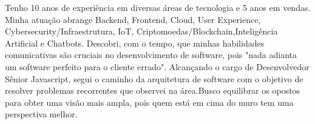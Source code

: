 

\begin{cvparagraph}

\vspace{2mm}

Tenho 10 anos de experiência em diversas áreas de tecnologia e 5 anos em vendas. Minha atuação abrange Backend, Frontend, Cloud, User Experience, Cybersecurity/Infraestrutura, IoT, Criptomoedas/Blockchain,Inteligência Artificial e Chatbots.
Descobri, com o tempo, que minhas habilidades comunicativas são cruciais no desenvolvimento de software, pois "nada adianta um software perfeito para o cliente errado". Alcançando o cargo de Desenvolvedor Sênior Javascript, segui o caminho da arquitetura de software com o objetivo de resolver problemas recorrentes que observei na área.Busco equilibrar os opostos para obter uma visão mais ampla, pois quem está em cima do muro tem uma perspectiva melhor.


    
\end{cvparagraph}
